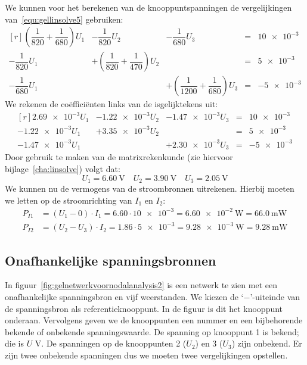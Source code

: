 \begin{example}
We kunnen voor het berekenen van de knooppuntspanningen de vergelijkingen van~\eqref{equ:gellinsolve5} gebruiken:
%
\begin{equation}
\begin{matrix*}[r]
\left(\dfrac{1}{820}+\dfrac{1}{680}\right)U_1 & -\dfrac{1}{820}U_2 & -\dfrac{1}{680}U_3 &=& \num{10e-3} \\[1em]
-\dfrac{1}{820}U_1 & +\left(\dfrac{1}{820}+\dfrac{1}{470}\right)U_2 &  & = & \num{5e-3} \\[1em]
-\dfrac{1}{680}U_1 && +\left(\dfrac{1}{1200}+\dfrac{1}{680}\right)U_3 & = &\num{-5e-3}
\end{matrix*}
\end{equation}
%
We rekenen de coëfficiënten links van de isgelijktekens uit:
%
\begin{equation}
\begin{matrix*}[r]
\num{2.69e-3}U_1 & \num{-1.22e-3}U_2 & \num{-1.47e-3}U_3 &=& \num{10e-3} \\[1em]
\num{-1.22e-3}U_1 & +\num{3.35e-3}U_2 &  & = & \num{5e-3} \\[1em]
\num{-1.47e-3}U_1 && +\num{2.30e-3}U_3 & = &\num{-5e-3}
\end{matrix*}
\end{equation}
%
Door gebruik te maken van de matrixrekenkunde (zie hiervoor bijlage~\ref{cha:linsolve}) volgt dat:
%
\begin{equation}
U_1 = \SI{6.60}{\volt} \quad U_2=\SI{3.90}{\volt} \quad U_3 = \SI{2.05}{\volt}
\end{equation}
%
We kunnen nu de vermogens van de stroombronnen uitrekenen. Hierbij moeten we letten op de stroomrichting van $I_1$ en $I_2$:
%
\begin{equation}
\begin{split}
P_{I1} &= (U_1-0)\cdot I_1 = \num{6,60}\cdot\num{10e-3} = \SI{6.60e-2}{\watt} = \SI{66.0}{\mW} \\
P_{I2} &= (U_2-U_3)\cdot I_2 = \num{1.86}\cdot\num{5e-3} = \SI{9.28e-3}{\watt} = \SI{9.28}{\mW}
\end{split}
\end{equation}
\end{example}

\subsection{Onafhankelijke spanningsbronnen}
In figuur~\ref{fig:gelnetwerkvoornodalanalysis2} is een netwerk te zien met een onafhankelijke spanningsbron en vijf weerstanden. We kiezen de `$-$'-uiteinde van de spanningsbron als referentieknooppunt. In de figuur is dit het knooppunt onderaan. Vervolgens geven we de knooppunten een nummer en een bijbehorende bekende of onbekende spanningswaarde. De spanning op knooppunt 1 is bekend; die is $U$ \si{\volt}. De spanningen op de knooppunten 2 ($U_2$) en 3 ($U_3$) zijn onbekend. Er zijn twee onbekende spanningen dus we moeten twee vergelijkingen opstellen.

